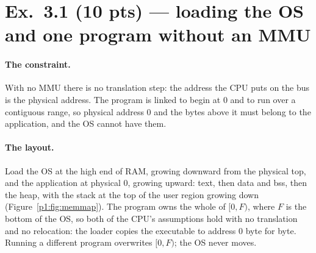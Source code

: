 \section*{Ex.~3.1 \quad (10 pts) --- loading the OS and one program without an MMU}

\paragraph{The constraint.}
With no MMU there is no translation step: the address the CPU puts on the bus is the
physical address. The program is linked to begin at 0 and to run over a contiguous
range, so physical address 0 and the bytes above it must belong to the application, and
the OS cannot have them.

\paragraph{The layout.}
Load the OS at the high end of RAM, growing downward from the physical top, and the
application at physical 0, growing upward: text, then data and bss, then the heap, with
the stack at the top of the user region growing down (Figure~\ref{p1:fig:memmap}). The
program owns the whole of $[0,F)$, where $F$ is the bottom of the OS, so both of the
CPU's assumptions hold with no translation and no relocation: the loader copies the
executable to address 0 byte for byte. Running a different program overwrites $[0,F)$;
the OS never moves.

